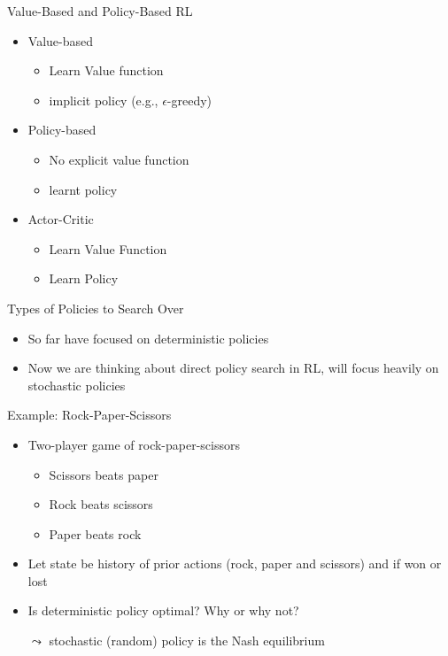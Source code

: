 \begin{frame}[c]{Value-Based and Policy-Based RL}

	\begin{itemize}
		\item Value-based
		\begin{itemize}
			\item Learn Value function
			\item implicit policy (e.g., $\epsilon$-greedy)
		\end{itemize}
		\item Policy-based
		\begin{itemize}
			\item No explicit value function
			\item learnt policy
		\end{itemize}
		\item Actor-Critic
		\begin{itemize}
			\item Learn Value Function
			\item Learn Policy
		\end{itemize}
		
	\end{itemize}		
	
\end{frame}
\begin{frame}[c]{Types of Policies to Search Over}
	
\begin{itemize}
	\item So far have focused on deterministic policies
	\item Now we are thinking about direct policy search in RL, will focus
	heavily on stochastic policies
\end{itemize}

\end{frame}
\begin{frame}[c]{Example: Rock-Paper-Scissors}
	
	\begin{itemize}
		\item Two-player game of rock-paper-scissors
		\begin{itemize}
			\item Scissors beats paper
			\item Rock beats scissors
			\item Paper beats rock
		\end{itemize}
		\item Let state be history of prior actions (rock, paper and scissors) and if
		won or lost
		\item Is deterministic policy optimal? Why or why not?
		\item[$\leadsto$] stochastic (random) policy is the Nash equilibrium
	\end{itemize}

	
\end{frame}
